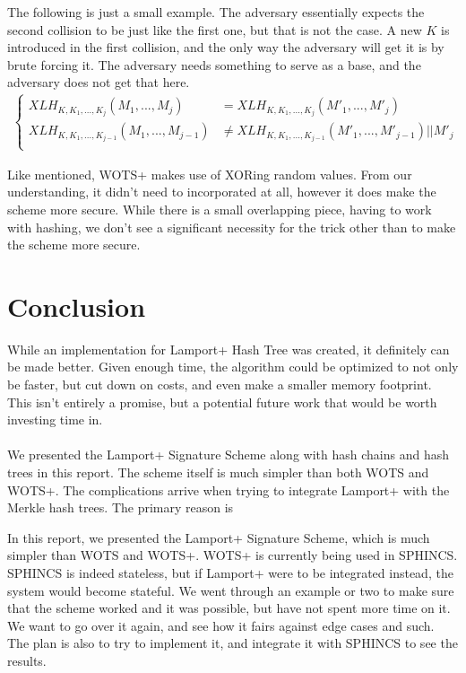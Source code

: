 \documentclass[]{scrartcl}
\begin{document}
The following is just a small example. The adversary essentially expects the second collision to be just like the first one, but that is not the case. A new $K$ is introduced in the first collision, and the only way the adversary will get it is by brute forcing it. The adversary needs something to serve as a base, and the adversary does not get that here.
\begin{equation}
\begin{split}
\begin{cases}
XLH_{K,K_1,...,K_j}(M_1,...,M_j) & =  XLH_{K,K_1,...,K_j}(M'_1,...,M'_j)\\
XLH_{K,K_1,...,K_{j-1}}(M_1,...,M_{j-1}) & \neq XLH_{K,K_1,...,K_{j-1}}(M'_1,...,M'_{j-1}) || M'_j\\
\end{cases}
\end{split}
\end{equation}

Like mentioned, WOTS+ makes use of XORing random values. From our understanding, it didn't need to incorporated at all, however it does make the scheme more secure. While there is a small overlapping piece, having to work with hashing, we don't see a significant necessity for the trick other than to make the scheme more secure.

\section*{Conclusion}
While an implementation for Lamport+ Hash Tree was created, it definitely can be made better. Given enough time, the algorithm could be optimized to not only be faster, but cut down on costs, and even make a smaller memory footprint. This isn't entirely a promise, but a potential future work that would be worth investing time in.\\ \\

We presented the Lamport+ Signature Scheme along with hash chains and hash trees in this report. The scheme itself is much simpler than both WOTS and WOTS+. The complications arrive when trying to integrate Lamport+ with the Merkle hash trees. The primary reason is 

In this report, we presented the Lamport+ Signature Scheme, which is much simpler than WOTS and WOTS+. WOTS+ is currently being used in SPHINCS. SPHINCS is indeed stateless, but if Lamport+ were to be integrated instead, the system would become stateful. We went through an example or two to make sure that the scheme worked and it was possible, but have not spent more time on it. We want to go over it again, and see how it fairs against edge cases and such. The plan is also to try to implement it, and integrate it with SPHINCS to see the results.
\end{document}
